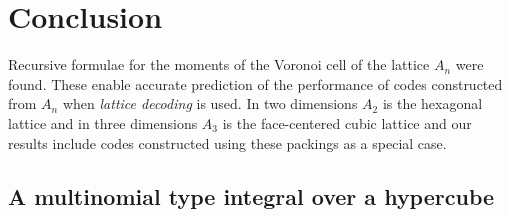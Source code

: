 \documentclass[draftcls, onecolumn, 11pt]{IEEEtran}
\begin{document}
\section{Conclusion}

Recursive formulae for the moments of the Voronoi cell of the lattice $A_n$ were found.  These enable accurate prediction of the performance of codes constructed from $A_n$ when \emph{lattice decoding} is used.  In two dimensions $A_2$ is the hexagonal lattice and in three dimensions $A_3$ is the face-centered cubic lattice and our results include codes constructed using these packings as a special case.  %


\appendix


\subsection{A multinomial type integral over a hypercube}\label{sec:mult-type-integr}
\end{document}
